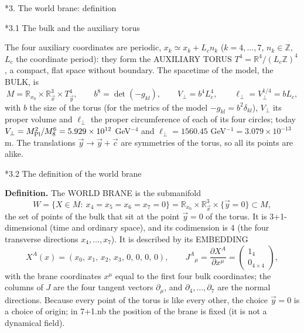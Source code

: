 \documentclass[10pt,a4paper]{article}
\makeatletter
\renewcommand\section{\@startsection{section}{1}{\z@}{-3.5ex \@plus -1ex \@minus -.2ex}{2.3ex \@plus.2ex}{\normalfont\Large\bfseries\raggedright}}
\renewcommand\subsection{\@startsection{subsection}{2}{\z@}{-3.25ex\@plus -1ex \@minus -.2ex}{1.5ex \@plus .2ex}{\normalfont\large\bfseries\raggedright}}
\makeatother
\begin{document}
\section*{3. The world brane: definition}
\subsection*{3.1 The bulk and the auxiliary torus}
The four auxiliary coordinates are periodic, $x_k\simeq x_k+L_cn_k$ ($k=4,\dots,7$, $n_k\in\mathbb Z$, $L_c$ the coordinate period): they form the AUXILIARY TORUS $T^4=\mathbb R^4/(L_c\mathbb Z)^4$, a compact, flat space without boundary. The spacetime of the model, the BULK, is
\begin{equation*}
M=\mathbb R_{x_0}\times\mathbb R^3_{\vec x}\times T^4_{\vec y},\qquad b^8=\det(-g_{kl}),\qquad V_\perp=b^4L_c^4,\qquad \ell_\perp=V_\perp^{1/4}=bL_c,
\end{equation*}
with $b$ the size of the torus (for the metrics of the model $-g_{kl}=b^2\delta_{kl}$), $V_\perp$ its proper volume and $\ell_\perp$ the proper circumference of each of its four circles; today $V_\perp=M_{\rm Pl}^2/M_8^6=5.929\times10^{12}$ GeV$^{-4}$ and $\ell_\perp=1560.45$ GeV$^{-1}=3.079\times10^{-13}$ m. The translations $\vec y\to\vec y+\vec c$ are symmetries of the torus, so all its points are alike.

\subsection*{3.2 The definition of the world brane}
\textbf{Definition.} The WORLD BRANE is the submanifold
\begin{equation*}
W=\{X\in M:\ x_4=x_5=x_6=x_7=0\}=\mathbb R_{x_0}\times\mathbb R^3_{\vec x}\times\{\vec y=0\}\subset M,
\end{equation*}
the set of points of the bulk that sit at the point $\vec y=0$ of the torus. It is 3+1-dimensional (time and ordinary space), and its codimension is 4 (the four transverse directions $x_4,\dots,x_7$). It is described by its EMBEDDING
\begin{equation*}
X^A(x)=(x_0,\,x_1,\,x_2,\,x_3,\,0,\,0,\,0,\,0),\qquad J^A{}_\mu=\frac{\partial X^A}{\partial x^\mu}=\begin{pmatrix}1_4\\0_{4\times4}\end{pmatrix},
\end{equation*}
with the brane coordinates $x^\mu$ equal to the first four bulk coordinates; the columns of $J$ are the four tangent vectors $\partial_\mu$, and $\partial_4,\dots,\partial_7$ are the normal directions. Because every point of the torus is like every other, the choice $\vec y=0$ is a choice of origin; in 7+1.nb the position of the brane is fixed (it is not a dynamical field).
\end{document}
